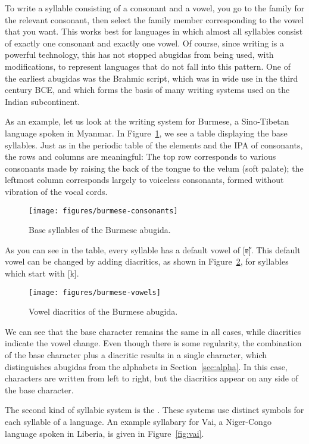 To write a syllable consisting of a consonant and a vowel,
you go to the family for the relevant consonant, then select the
family member corresponding to the vowel that you want. This works 
best for languages in which almost all syllables consist of exactly one
consonant and exactly one vowel.  Of course, since writing is a powerful 
technology, this has not stopped abugidas from being used, with modifications,
to represent languages that do not fall into this pattern. 
One of the earliest abugidas was the Brahmic script, which was in wide use
in the third century BCE, and which forms the basis of many writing systems used
on the Indian subcontinent.

As an example, let us look at the writing system for Burmese, a Sino-Tibetan language spoken in Myanmar.  
%
In
Figure~\ref{fig:burmese-c}, we see a table displaying the base syllables.  Just as in the periodic table of the elements and the IPA of consonants, the rows and columns are meaningful: The top row corresponds to various consonants made by raising the back of the tongue to the velum (soft palate); the leftmost column corresponds largely to voiceless consonants, formed without vibration of the vocal cords.

\begin{figure}
\texttt{[image: figures/burmese-consonants]}
\caption{Base syllables of the Burmese abugida.}
\label{fig:burmese-c}
\end{figure}

As you can see in the table, every syllable has a default vowel of
{[\~ɐ]}.  This default vowel can be changed by adding
diacritics, as shown in Figure~\ref{fig:burmese-v}, for syllables
which start with {[k]}.

\begin{figure}
  \texttt{[image: figures/burmese-vowels]}
\caption{Vowel diacritics of the Burmese abugida.}
\label{fig:burmese-v}
\end{figure}

We can see that the base character remains the same in all cases,
while diacritics indicate the vowel change.  Even though there is some
regularity, the combination of the base character plus a diacritic
results in a single character, which distinguishes abugidas from the
alphabets in Section~\ref{sec:alpha}. In this case, characters are written from
left to right, but the diacritics appear on any side of the
base character.  

The second kind of syllabic system is the .  These
systems use distinct symbols for each syllable of a language.
An example syllabary for Vai, a Niger-Congo language spoken in
Liberia, is given in Figure~\ref{fig:vai}.

